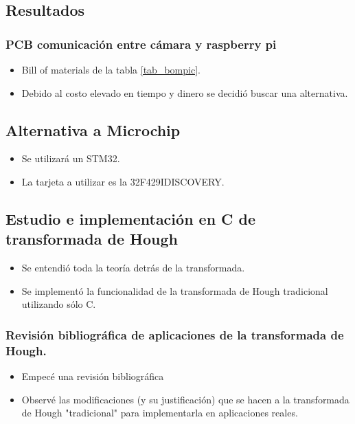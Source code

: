 
\subsection{Resultados}

\subsubsection{PCB comunicación entre cámara y raspberry pi}
\begin{itemize}
	\item Bill of materials de la tabla \ref{tab_bompic}.
	\item Debido al costo elevado en tiempo y dinero se decidió buscar una alternativa.
\end{itemize}

\subsection{Alternativa a Microchip}
\begin{itemize}
	\item Se utilizará un STM32.
	\item La tarjeta a utilizar es la 32F429IDISCOVERY.
\end{itemize}

\subsection{Estudio e implementación en C de transformada de Hough}
\begin{itemize}
	\item Se entendió toda la teoría detrás de la transformada.
	\item Se implementó la funcionalidad de la transformada de Hough tradicional utilizando sólo C.
\end{itemize}

\subsubsection{Revisión bibliográfica de aplicaciones de la transformada de Hough.}
\begin{itemize}
	\item Empecé una revisión bibliográfica
	\item Observé las modificaciones (y su justificación) que se hacen a la transformada de Hough "tradicional" para implementarla en aplicaciones reales.
\end{itemize}

